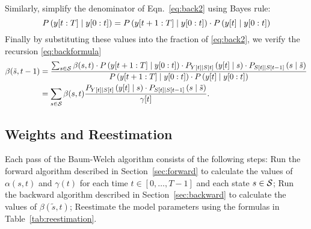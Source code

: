 Similarly, simplify the denominator of Eqn.~\eqref{eq:back2} using
Bayes rule:
\begin{equation*}
  P \left(y[t:T]\mid y[0:t] \right) = P
  \left(y[t+1:T]\mid y[0:t]  \right) \cdot {P \left(
  {y}{[t]}\mid y[0:t]\right)}
\end{equation*}
Finally by substituting these values into the fraction of
\eqref{eq:back2}, we verify the recursion \eqref{eq:backformula}
\begin{align}
  \mlabel{eq:back3} \beta({\tilde s},t-1) &= \frac{\sum_{s\in\states}
    \beta(s,t) \cdot P \left(\ts{y}{t+1}{T}\given \ts{y}{0}{t} \right)
    \cdot P_{\ti{Y}{t}\given \ti{S}{t}} \left(\ti{y}{t}\given s \right) \cdot
    P_{\ti{S}{t}\given \ti{S}{t-1}} \left(s\given {\tilde s} \right)} {P
    \left(\ts{y}{t+1}{T}\given \ts{y}{0}{t} \right) \cdot {P \left(
        \ti{y}{t}\given \ts{y}{0}{t}\right)}} \\
  \mlabel{eq:back4} &= \sum_{s\in\states} \beta(s,t) \frac{
    P_{\ti{Y}{t}\given \ti{S}{t}} \left(\ti{y}{t}\given s \right) \cdot
    P_{\ti{S}{t}\given \ti{S}{t-1}} \left(s\given {\tilde s} \right)} {\ti{\gamma}{t}}.
\end{align}

\subsection{Weights and Reestimation}
\label{sec:reestimation}

Each pass of the Baum-Welch algorithm consists of the following steps:
Run the forward algorithm described in Section~\ref{sec:forward} to
calculate the values of $\alpha(s,t)$ and $\gamma(t)$ for each time $t
\in [0,\ldots,T-1]$ and each state $s \in \states$; Run the backward
algorithm described in Section~\ref{sec:backward} to calculate the
values of $\beta({\tilde s},t)$; Reestimate the model parameters using the
formulas in Table~\ref{tab:reestimation}.


